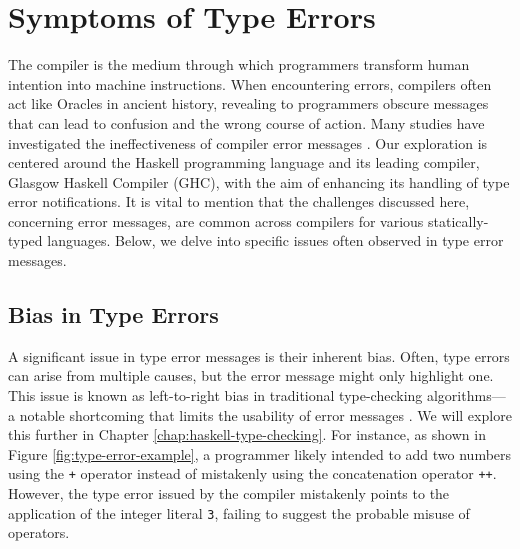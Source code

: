 \section{Symptoms of Type Errors}
\label{sec:symptoms}
 The compiler is the medium through which programmers transform human intention into machine instructions. When encountering errors, compilers often act like Oracles in ancient history, revealing to programmers obscure messages that can lead to confusion and the wrong course of action. Many studies have investigated the ineffectiveness of compiler error messages \cite{Barik2017-gy, Becker2019-cs, Becker2016-kc}.  Our exploration is centered around the Haskell programming language and its leading compiler, Glasgow Haskell Compiler (GHC), with the aim of enhancing its handling of type error notifications. It is vital to mention that the challenges discussed here, concerning error messages, are common across compilers for various statically-typed languages. Below, we delve into specific issues often observed in type error messages.


 \subsection{Bias in Type Errors} 
 \label{subsec:bias}
 
A significant issue in type error messages is their inherent bias. Often, type errors can arise from multiple causes, but the error message might only highlight one. This issue is known as left-to-right bias in traditional type-checking algorithms—a notable shortcoming that limits the usability of error messages \cite{McAdam2002-vb, Lee1998-fx, Chen2014-ev}. We will explore this further in Chapter \ref{chap:haskell-type-checking}. For instance, as shown in Figure \ref{fig:type-error-example}, a programmer likely intended to add two numbers using the \texttt{+} operator instead of mistakenly using the concatenation operator \texttt{++}. However, the type error issued by the compiler mistakenly points to the application of the integer literal \texttt{3}, failing to suggest the probable misuse of operators.

